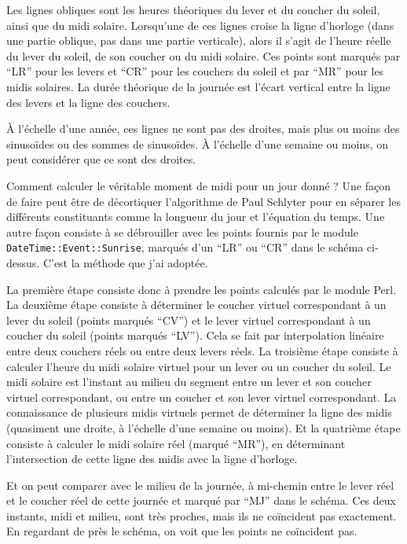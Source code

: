 \documentclass[a4paper]{article}
\newenvironment{texte}{\rmfamily}{}
\begin{document}
\begin{texte}
Les lignes obliques sont les heures théoriques du lever et du coucher
du soleil, ainsi que du midi solaire. Lorsqu'une de ces lignes
croise la ligne d'horloge (dans une partie oblique, pas dans
une partie verticale), alors il s'agit de l'heure réelle du lever
du soleil, de son coucher ou du midi solaire.
Ces points sont marqués par ``LR'' pour les levers et
``CR'' pour les couchers
du soleil et par ``MR'' pour les midis solaires.
La durée théorique de la journée est l'écart vertical
entre la ligne des levers et la ligne des couchers.

À l'échelle d'une année, ces lignes ne sont pas des droites, mais plus
ou moins des sinusoïdes ou des sommes de sinusoïdes. À l'échelle d'une
semaine ou moins, on peut considérer que ce sont des droites.

Comment calculer le véritable moment de midi pour un jour
donné ? Une façon de faire peut être de décortiquer l'algorithme
de Paul Schlyter pour en séparer les différents constituants
comme la longueur du jour et l'équation du temps. Une autre
façon consiste à se débrouiller avec les points fournis
par le module \texttt{DateTime::Event::Sunrise}, marqués d'un ``LR'' ou ``CR''
dans le schéma ci-dessus. C'est la méthode que j'ai adoptée.

La première étape consiste donc à prendre les points calculés
par le module Perl. La deuxième étape consiste à déterminer
le coucher virtuel correspondant à un lever du soleil 
(points marqués ``CV'') et
le lever virtuel correspondant à un coucher du soleil
(points marqués ``LV''). Cela se fait par interpolation
linéaire entre deux couchers réels ou entre deux levers réels.
La troisième étape consiste à calculer l'heure du midi solaire
virtuel pour un lever ou un coucher du soleil. Le midi solaire
est l'instant au milieu du segment entre un lever et son coucher
virtuel correspondant, ou entre un coucher et son lever virtuel
correspondant. La connaissance de plusieurs midis virtuels permet
de déterminer la ligne des midis (quasiment une droite, à l'échelle
d'une semaine ou moins).
Et la quatrième étape consiste à calculer le midi
solaire réel (marqué ``MR''), en déterminant l'intersection de cette ligne des
midis avec la ligne d'horloge.

Et on peut comparer avec le milieu de la journée, à mi-chemin
entre le lever réel et le coucher réel de cette journée
et marqué par ``MJ'' dans le schéma.
Ces deux instants, midi et milieu, sont très proches, mais
ils ne coïncident pas exactement. En regardant de près le schéma,
on voit que les points ne coïncident pas.



\end{texte}
\end{document}

